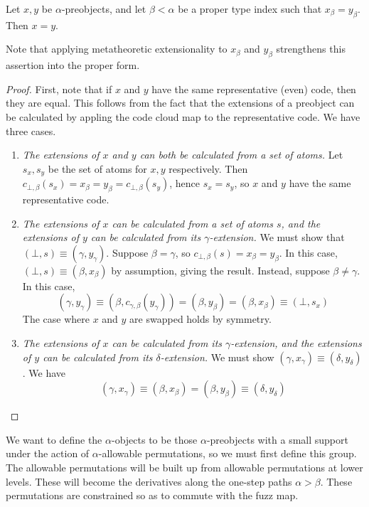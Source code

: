 \begin{theorem}
    Let \( x, y \) be \( \alpha \)-preobjects, and let \( \beta < \alpha \) be a proper type index such that \( x_\beta = y_\beta \).
    Then \( x = y \).
\end{theorem}
Note that applying metatheoretic extensionality to \( x_\beta \) and \( y_\beta \) strengthens this assertion into the proper form.
\begin{proof}
    First, note that if \( x \) and \( y \) have the same representative (even) code, then they are equal.
    This follows from the fact that the extensions of a preobject can be calculated by appling the code cloud map to the representative code.
    We have three cases.
    \begin{enumerate}
        \item \emph{The extensions of \( x \) and \( y \) can both be calculated from a set of atoms.}
        Let \( s_x, s_y \) be the set of atoms for \( x, y \) respectively.
        Then \( c_{\bot,\beta}(s_x) = x_\beta = y_\beta = c_{\bot,\beta}(s_y) \), hence \( s_x = s_y \), so \( x \) and \( y \) have the same representative code.
        \item \emph{The extensions of \( x \) can be calculated from a set of atoms \( s \), and the extensions of \( y \) can be calculated from its \( \gamma \)-extension.}
        We must show that \( (\bot, s) \equiv (\gamma, y_\gamma) \).
        Suppose \( \beta = \gamma \), so \( c_{\bot,\beta}(s) = x_\beta = y_\beta \).
        In this case, \( (\bot, s) \equiv (\beta, x_\beta) \) by assumption, giving the result.
        Instead, suppose \( \beta \neq \gamma \).
        In this case,
        \[ (\gamma, y_\gamma) \equiv (\beta, c_{\gamma,\beta}(y_\gamma)) = (\beta, y_\beta) = (\beta, x_\beta) \equiv (\bot, s_x) \]
        The case where \( x \) and \( y \) are swapped holds by symmetry.
        \item \emph{The extensions of \( x \) can be calculated from its \( \gamma \)-extension, and the extensions of \( y \) can be calculated from its \( \delta \)-extension.}
        We must show \( (\gamma, x_\gamma) \equiv (\delta, y_\delta) \).
        We have
        \[ (\gamma, x_\gamma) \equiv (\beta, x_\beta) = (\beta, y_\beta) \equiv (\delta, y_\delta) \]
    \end{enumerate}
\end{proof}

We want to define the \( \alpha \)-objects to be those \( \alpha \)-preobjects with a small support under the action of \( \alpha \)-allowable permutations, so we must first define this group.
The allowable permutations will be built up from allowable permutations at lower levels.
These will become the derivatives along the one-step paths \( \alpha > \beta \).
These permutations are constrained so as to commute with the fuzz map.


